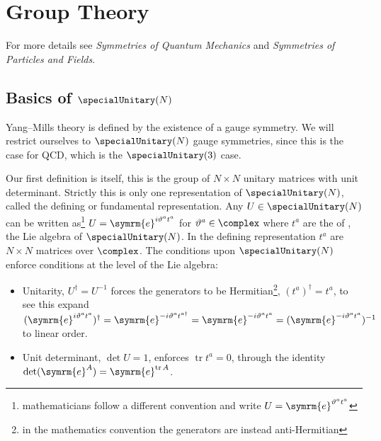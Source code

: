 \documentclass[fleqn]{NotesClass}
\newcommand*{\course}[1]{\textit{#1}}
\newcommand{\e}{\symrm{e}}
\newcommand{\hermit}{\dagger}
\DeclareMathOperator{\tr}{tr}
\begin{document}
    
    \chapter{Group Theory}
    For more details see \course{Symmetries of Quantum Mechanics} and \course{Symmetries of Particles and Fields}.
    
    \section{Basics of \texorpdfstring{\(\specialUnitary(N)\)}{SU(N)}}
    Yang--Mills theory is defined by the existence of a gauge symmetry.
    We will restrict ourselves to \(\specialUnitary(N)\) gauge symmetries, since this is the case for QCD, which is the \(\specialUnitary(3)\) case.
    
    Our first definition is  itself, this is the group of \(N \times N\) unitary matrices with unit determinant.
    Strictly this is only one representation of \(\specialUnitary(N)\), called the defining or fundamental representation.
    Any \(U \in \specialUnitary(N)\) can be written as\footnote{mathematicians follow a different convention and write \(U = \e^{\vartheta^a t^a}\)} \(U = \e^{i\vartheta^a t^a}\) for \(\vartheta^a \in \complex\) where \(t^a\) are the  of , the Lie algebra of \(\specialUnitary(N)\).
    In the defining representation \(t^a\) are \(N \times N\) matrices over \(\complex\).
    The conditions upon \(\specialUnitary(N)\) enforce conditions at the level of the Lie algebra:
    \begin{itemize}
        \item Unitarity, \(U^\hermit = U^{-1}\) forces the generators to be Hermitian\footnote{in the mathematics convention the generators are instead anti-Hermitian}, \((t^a)^\hermit = t^a\), to see this expand \((\e^{i\vartheta^a t^a})^\hermit = \e^{-i\vartheta^a t^{a\hermit}} = \e^{-i\vartheta^a t^a} = (\e^{-i\vartheta^a t^a})^{-1}\) to linear order.
        \item Unit determinant, \(\det U = 1\), enforces \(\tr t^a = 0\), through the identity \(\det(\e^A) = \e^{\tr A}\).
    \end{itemize}
    
\end{document}
